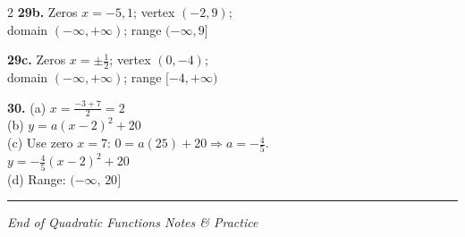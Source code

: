 \documentclass[11pt]{article}
\begin{document}
\begin{multicols}{2}
\medskip
\textbf{29b.} Zeros $x=-5,1$; vertex $(-2,9)$;\\
domain $(-\infty,+\infty)$; range $(-\infty,9]$

\medskip
\textbf{29c.} Zeros $x=\pm\tfrac{1}{2}$; vertex $(0,-4)$;\\
domain $(-\infty,+\infty)$; range $[-4,+\infty)$

\medskip
\textbf{30.}
(a) $x = \frac{-3+7}{2} = 2$\\
(b) $y = a(x-2)^2+20$\\
(c) Use zero $x=7$: $0=a(25)+20 \Rightarrow a=-\tfrac{4}{5}$.\\
$y=-\tfrac{4}{5}(x-2)^2+20$\\
(d) Range: $(-\infty,\,20]$

\end{multicols}

\vspace{0.5cm}
\hrule
\begin{center}
  \textit{End of Quadratic Functions Notes \& Practice}
\end{center}
\end{document}
